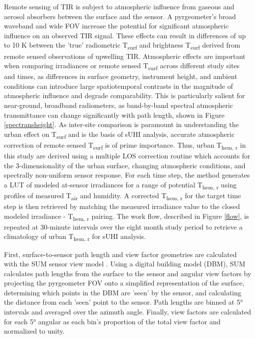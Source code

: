 \begin{bibunit}
Remote sensing of TIR is subject to atmospheric influence from gaseous and aerosol absorbers between the surface and the sensor. A pyrgeometer's broad waveband and wide FOV increase the potential for significant atmospheric influence on an observed TIR signal. These effects can result in differences of up to 10 \si{\kelvin} between the 'true' radiometric T\textsubscript{surf} and brightness T\textsubscript{surf} derived from remote sensed observations of upwelling TIR. Atmospheric effects are important when comparing irradiances or remote sensed T\textsubscript{surf} across different study sites and times, as differences in surface geometry, instrument height, and ambient conditions can introduce large spatiotemporal contrasts in the magnitude of atmospheric influence and degrade comparability. This is particularly salient for near-ground, broadband radiometers, as band-by-band spectral atmospheric transmittance can change significantly with path length, shown in Figure \ref{spectransheight}. As inter-site comparison is paramount in understanding the urban effect on T\textsubscript{surf} and is the basis of sUHI analysis, accurate atmospheric correction of remote sensed T\textsubscript{surf} is of prime importance. Thus, urban T\textsubscript{hem, r} in this study are derived using a multiple LOS correction routine which accounts for the 3-dimensionality of the urban surface, changing atmospheric conditions, and spectrally non-uniform sensor response. For each time step, the method generates a LUT of modeled at-sensor irradiances for a range of potential T\textsubscript{hem, r} using profiles of measured T\textsubscript{air} and humidity. A corrected T\textsubscript{hem, r} for the target time step is then retrieved by matching the measured irradiance value to the closed modeled irradiance - T\textsubscript{hem, r} pairing. The work flow, described in Figure \ref{flow}, is repeated at 30-minute intervals over the eight month study period to retrieve a climatology of urban T\textsubscript{hem, r} for sUHI analysis.

First, surface-to-sensor path length and view factor geometries are calculated with the SUM sensor view model \citep{Soux2004}. Using a digital building model (DBM), SUM calculates path lengths from the surface to the sensor and angular view factors by projecting the pyrgeometer FOV onto a simplified representation of the surface, determining which points in the DBM are 'seen' by the sensor, and calculating the distance from each 'seen' point to the sensor. Path lengths are binned at 5\si{\degree} intervals and averaged over the azimuth angle. Finally, view factors are calculated for each 5\si{\degree} angular as each bin's proportion of the total view factor and normalized to unity.


\end{bibunit}
